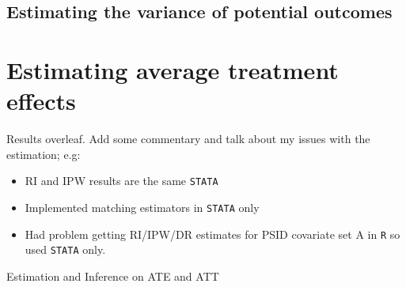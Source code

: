 \documentclass[12pt]{article}
\begin{document}
\subsection{Estimating the variance of potential outcomes}


\newpage
\section{Estimating average treatment effects}

Results overleaf. Add some commentary and talk about my issues with the estimation; e.g:
\begin{itemize}
\item RI and IPW results are the same \verb|STATA|
\item Implemented matching estimators in \verb|STATA| only
\item Had problem getting RI/IPW/DR estimates for PSID covariate set A in \verb|R| so used \verb|STATA| only.
\end{itemize}



\begin{landscape}
\begin{table}
\centering
\caption{Estimation and Inference on ATE and ATT}\label{tab:tableQ2}
\vspace{-.1in}\resizebox{\columnwidth}{!}{
\subfloat[][ATE]{}\quad
\subfloat[][ATT]{}
}
\end{table}
\end{landscape}

\newpage
\end{document}
